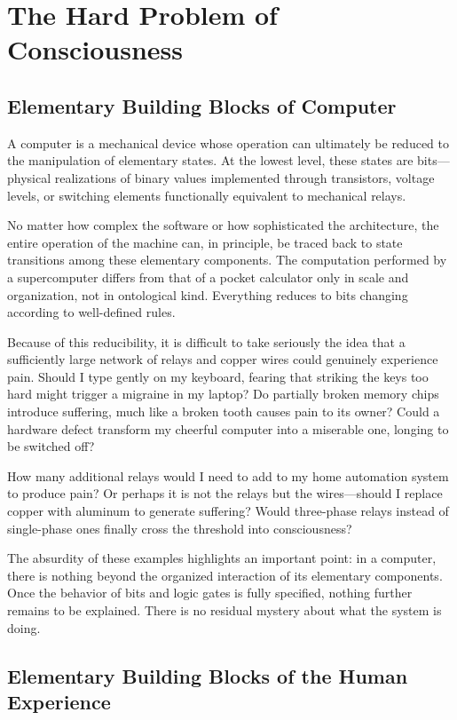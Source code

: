 \section{The Hard Problem of Consciousness}

\subsection*{Elementary Building Blocks of Computer}

A computer is a mechanical device whose operation can ultimately be reduced to the manipulation of elementary states. At the lowest level, these states are bits—physical realizations of binary values implemented through transistors, voltage levels, or switching elements functionally equivalent to mechanical relays.

No matter how complex the software or how sophisticated the architecture, the entire operation of the machine can, in principle, be traced back to state transitions among these elementary components. The computation performed by a supercomputer differs from that of a pocket calculator only in scale and organization, not in ontological kind. Everything reduces to bits changing according to well-defined rules.

Because of this reducibility, it is difficult to take seriously the idea that a sufficiently large network of relays and copper wires could genuinely experience pain. Should I type gently on my keyboard, fearing that striking the keys too hard might trigger a migraine in my laptop? Do partially broken memory chips introduce suffering, much like a broken tooth causes pain to its owner? Could a hardware defect transform my cheerful computer into a miserable one, longing to be switched off?

How many additional relays would I need to add to my home automation system to produce pain? Or perhaps it is not the relays but the wires—should I replace copper with aluminum to generate suffering? Would three-phase relays instead of single-phase ones finally cross the threshold into consciousness?

The absurdity of these examples highlights an important point: in a computer, there is nothing beyond the organized interaction of its elementary components. Once the behavior of bits and logic gates is fully specified, nothing further remains to be explained. There is no residual mystery about what the system is doing.


\subsection*{Elementary Building Blocks of the Human Experience}

